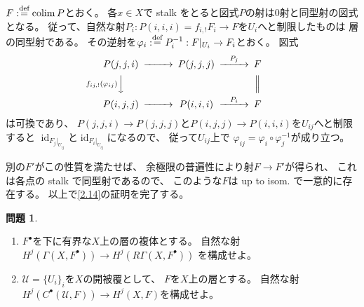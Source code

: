 \documentclass[uplatex,dvipdfmx]{jsarticle}
\makeatletter
\theoremstyle{definition}
\newtheorem{prob}[prob]{問題}
\renewenvironment{proof}[1][\proofname]{
  \pushQED{\qed}%
  \normalfont \topsep6\p@\@plus6\p@\relax
  \trivlist
  \item[\hskip\labelsep
    #1\@addpunct{\textbf{.}}]\ignorespaces
}{%
  \popQED\endtrivlist\@endpefalse
}
\providecommand{\proofname}{証明}
\DeclareMathOperator{\id}{\mathrm{id}}
\DeclareMathOperator{\colim}{\mathrm{colim}}
\newcommand\mcU{\mathcal{U}}
\def\dfn{:\overset{\mbox{{\scriptsize def}}}{=}}
\makeatother
\begin{document}
\begin{proof}
  \(F\dfn \colim P\)とおく。
  各\(x\in X\)で stalk をとると図式\(P\)の射は\(0\)射と同型射の図式となる。
  従って、自然な射\(P_i:P(i,i,i)=f_{i,!}F_i\to F\)を\(U_i\)へと制限したものは
  層の同型射である。
  その逆射を\(\varphi_i\dfn P_i^{-1}:F|_{U_i}\to F_i\)とおく。
  図式
  \[
  \begin{CD}
    P(j,j,i) @>>> P(j,j,j) @> P_j >> F \\
    @V f_{ij,!}(\varphi_{ij}) VV @. @| \\
    P(i,j,j) @>>> P(i,i,i) @> P_i >> F
  \end{CD}
  \]
  は可換であり、
  \(P(j,j,i)\to P(j,j,j)\)と\(P(i,j,j)\to P(i,i,i)\)を\(U_{ij}\)へと制限すると
  \(\id_{F_j|_{U_{ij}}}\)と\(\id_{F_i|_{U_{ij}}}\)になるので、
  従って\(U_{ij}\)上で
  \(\varphi_{ij} = \varphi_i\circ \varphi_j^{-1}\)が成り立つ。

  別の\(F'\)がこの性質を満たせば、
  余極限の普遍性により射\(F\to F'\)が得られ、
  これは各点の stalk で同型射であるので、
  このような\(F\)は up to isom. で一意的に存在する。
  以上で\autoref{2.14}の証明を完了する。
\end{proof}










\begin{prob}\label{2.15}
  \begin{enumerate}
    \item \label{2.15.1}
    \(F^{\bullet}\)を下に有界な\(X\)上の層の複体とする。
    自然な射
    \(H^j(\Gamma(X,F^{\bullet})) \to H^j(R\Gamma(X,F^{\bullet}))\)
    を構成せよ。
    \item \label{2.15.2}
    \(\mcU = \{U_i\}_i\)を\(X\)の開被覆として、
    \(F\)を\(X\)上の層とする。
    自然な射\(H^j(C^{\bullet}(\mcU,F)) \to H^j(X,F)\)を構成せよ。
  \end{enumerate}
\end{prob}
\end{document}
